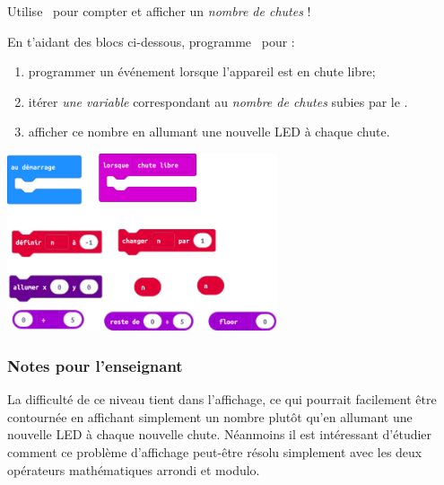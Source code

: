 \begin{eleve}
Utilise \mb~pour compter et afficher un \emph{nombre de chutes} !

En t'aidant des blocs ci-dessous, programme \mb~pour : 
\begin{enumerate}
    \item programmer un événement lorsque l'appareil est en chute libre;
    \item itérer \emph{une variable} correspondant au \emph{nombre de chutes} subies par le \mb.
    \item afficher ce nombre en allumant une nouvelle LED à chaque chute.
\end{enumerate}

\includegraphics[width=0.6\textwidth]{res/mbChutesN1blocs.png}

\end{eleve}

\newpage
\subsubsection{Notes pour l'enseignant}

La difficulté de ce niveau tient dans l'affichage, ce qui pourrait facilement être contournée en affichant simplement un nombre plutôt qu'en allumant une nouvelle LED à chaque nouvelle chute. Néanmoins il est intéressant d'étudier comment ce problème d'affichage peut-être résolu simplement avec les deux opérateurs mathématiques arrondi et modulo.


